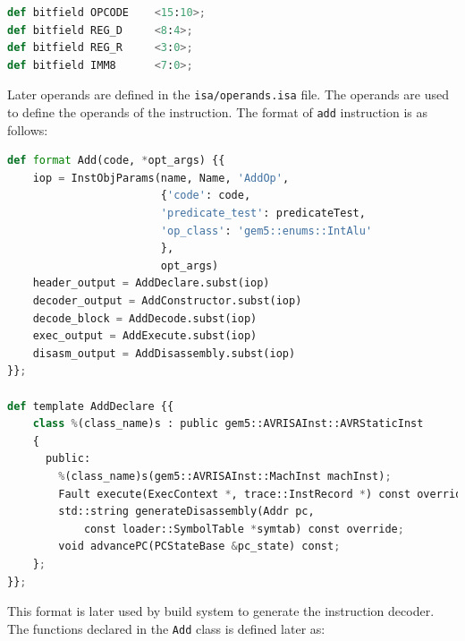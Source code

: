 \begin{lstlisting}[language=python, caption={Bitfield definition of the instruction}, label={lst:bitfield}]
def bitfield OPCODE    <15:10>;
def bitfield REG_D     <8:4>;
def bitfield REG_R     <3:0>;
def bitfield IMM8      <7:0>;
\end{lstlisting}

Later operands are defined in the \texttt{isa/operands.isa} file. The operands are used to define the operands of the instruction. The format of \texttt{add} instruction is as follows:
\begin{lstlisting}[language=python, caption={Operands of the instruction}, label={lst:operands}]
def format Add(code, *opt_args) {{
    iop = InstObjParams(name, Name, 'AddOp',
                        {'code': code,
                        'predicate_test': predicateTest,
                        'op_class': 'gem5::enums::IntAlu'
                        },
                        opt_args)
    header_output = AddDeclare.subst(iop)
    decoder_output = AddConstructor.subst(iop)
    decode_block = AddDecode.subst(iop)
    exec_output = AddExecute.subst(iop)
    disasm_output = AddDisassembly.subst(iop)
}};

def template AddDeclare {{
    class %(class_name)s : public gem5::AVRISAInst::AVRStaticInst
    {
      public:
        %(class_name)s(gem5::AVRISAInst::MachInst machInst);
        Fault execute(ExecContext *, trace::InstRecord *) const override;
        std::string generateDisassembly(Addr pc,
            const loader::SymbolTable *symtab) const override;
        void advancePC(PCStateBase &pc_state) const;
    };
}};

\end{lstlisting}
This format is later used by build system to generate the instruction decoder. The functions declared in the \texttt{Add} class is defined later as:
